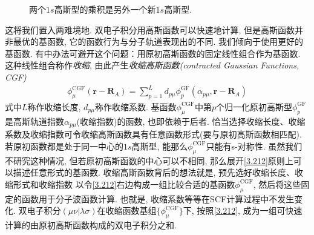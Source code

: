 \begin{figure}[h]\centering
	\def\FunctionA(x){
		3*sqrt(3)*exp(-9*x^2)*(2/3.1415)^(3/4)}
	\def\FunctionB(x){
		(4*2^(1/4))*(e^(-4*(-0.5+x)^2))/3.1415^(3/4)
	}
	\def\FunctionC(x){
		\FunctionB(x)*\FunctionA(x)/4.5
	}
	\caption{两个$1s$高斯型的乘积是另外一个新$1s$高斯型.}
	\label{f3.1}
\end{figure}
这将我们置入两难境地. 
双电子积分用高斯函数可以快速地计算, 
但是高斯函数并非最优的基函数, 
它的函数行为与分子轨道表现出的不同. 
我们倾向于使用更好的基函数. 
有中办法可避开这个问题：用原初高斯函数的固定线性组合作为基函数. 
这种线性组合称作\emph{收缩}, 
由此产生\emph{收缩高斯函数(contracted Gaussian Functions, CGF)}
\begin{align}
	\label{3.212}
	\phi_\mu^{\mathrm{CGF}}(\mathbf{r-R}_A) = \sum_{p=1}^{L}d_{p\mu}\phi_p^\mathrm{GF}(\alpha_{p\mu},\mathbf{r-R}_{A})
\end{align} 
式中$L$称作收缩长度, 
$d_{p\mu}$称作收缩系数. 
基函数$\phi_\mu^\mathrm{CGF}$中第$p$个归一化原初高斯型$\phi_p^\mathrm{GF}$是高斯轨道指数$\alpha_{p\mu}$(收缩指数)的函数, 也即依赖于后者. 
恰当选择收缩长度、收缩系数及收缩指数可令收缩高斯函数具有任意函数形式(要与原初高斯函数相匹配). 
若原初函数都是处于同一中心的$1s$高斯型, 
能那么$\phi_\mu^\mathrm{CGF}$只能有s-对称性. 
虽然我们不研究这种情况, 
但若原初高斯函数的中心可以不相同, 
那么展开\autoref{3.212}原则上可以描述任意形式的基函数. 
收缩高斯函数背后的想法就是, 
预先选好收缩长度、收缩形式和收缩指数
以令\autoref{3.212}右边构成一组比较合适的基函数$\phi_\mu^\mathrm{CGF}$, 
然后将这些固定的函数用于分子波函数计算. 
也就是, 
收缩系数等等在SCF计算过程中不发生变化. 
双电子积分$(\mu\nu|\lambda\sigma)$在收缩函数基组$\{\phi_\mu^\mathrm{CGF}\}$下, 
按照\autoref{3.212}, 
成为一组可快速计算的由原初高斯函数构成的双电子积分之和. 



